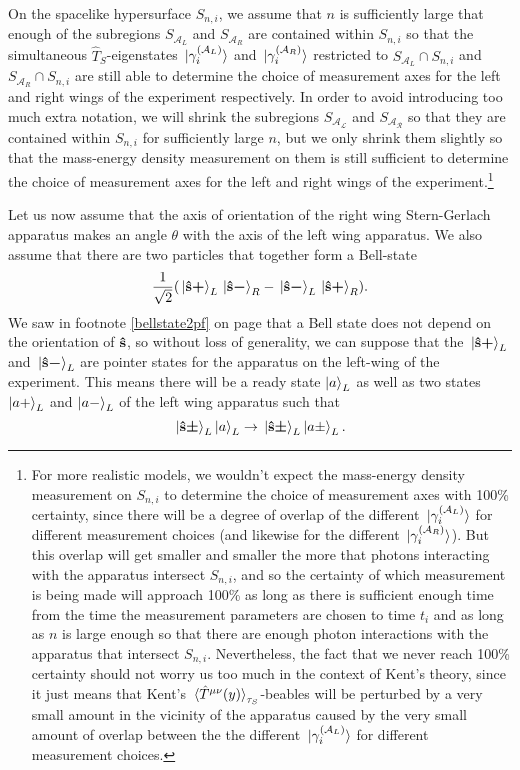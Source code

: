 On the spacelike hypersurface $S_{n,i}$, we assume that $n$ is sufficiently large that enough of the subregions $S_{\mathcal{A}_L}$ and $S_{\mathcal{A}_R}$ are contained within $S_{n,i}$ so that the simultaneous $\hat{T}_S$-eigenstates $\ket*{\gamma_i^{(\mathcal{A}_L)}}$ and $\ket*{\gamma_i^{(\mathcal{A}_R)}}$ restricted to $S_{\mathcal{A}_L}\cap S_{n,i}$ and $S_{\mathcal{A}_R}\cap S_{n,i}$ are still able to determine the choice of measurement axes for the left and right wings of the experiment respectively. In order to avoid introducing too much extra notation, we will shrink the subregions $S_{\mathcal{A_L}}$ and $S_{\mathcal{A_R}}$ so that they are contained within $S_{n,i}$ for sufficiently large $n$, but we only shrink them slightly so that the mass-energy density measurement on them is still sufficient to determine the choice of measurement axes for the left and right wings of the experiment.\footnote{For more realistic models, we wouldn't expect the mass-energy density measurement on $S_{n,i}$ to determine the choice of measurement axes with 100\% certainty, since there will be a degree of overlap of the different $\ket*{\gamma_i^{(\mathcal{A}_L)}}$ for different measurement choices (and likewise for the different $\ket*{\gamma_i^{(\mathcal{A}_R)}}$). But this overlap will get smaller and smaller the more that photons interacting with the apparatus intersect $S_{n,i}$, and so the certainty of which measurement is being made will approach 100\% as long as there is sufficient enough time from the time the measurement parameters are chosen to time $t_i$ and as long as $n$ is large enough so that there are enough photon interactions with the apparatus that intersect $S_{n,i}$. Nevertheless, the fact that we never reach 100\% certainty should not worry us too much in the context of Kent's theory, since it just means that Kent's $\ev*{\hat{T}^{\mu\nu}(y)}_{\tau_S}$-beables will be perturbed by a very small amount in the vicinity of the apparatus caused by the very small amount of overlap between the the different $\ket*{\gamma_i^{(\mathcal{A}_L)}}$ for different measurement choices. }   

Let us now assume that the axis of orientation of the right wing Stern-Gerlach apparatus makes an angle $\theta$ with the axis of the left wing apparatus. We also assume that there are two particles that together form a Bell-state \begin{equation}\label{bellstatePI}
	\frac{1}{\sqrt{2}}(\ket*{\vb{\hat{{s}}}\bm{+}}_L\ket*{\vb{\hat{{s}}}\bm{-}}_R-\ket*{\vb{\hat{{s}}}\bm{-}}_L\ket*{\vb{\hat{{s}}}\bm{+}}_R).
\end{equation}
We saw  in footnote \ref{bellstate2pf} on page \pageref{bellstate2pf} that a Bell state does not depend on the orientation of $\vb{\hat{{s}}}$, so without loss of generality, we can suppose that the $\ket*{\vb{\hat{{s}}}\bm{+}}_L$ and $\ket*{\vb{\hat{{s}}}\bm{-}}_L$ are pointer states for the apparatus on the left-wing of the experiment. This means there will be a ready state $\ket{a}_L$  as well as two states $\ket{a+}_L$ and $\ket{a-}_L$ of the left wing apparatus such that 
$$\ket*{\vb{\hat{{s}}}\bm{\pm}}_L\ket{a}_L\rightarrow\ket*{\vb{\hat{{s}}}\bm{\pm}}_L\ket{a\pm}_L.$$


